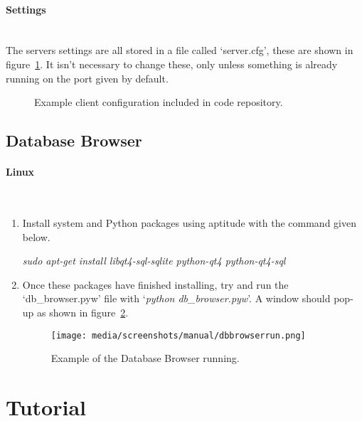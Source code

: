 \documentclass[12pt,a4paper]{report}
\begin{document}
        \paragraph{Settings}\mbox{}\\
        The servers settings are all stored in a file called `server.cfg', these are shown in figure~\ref{lst:servercfg}. It isn't
        necessary to change these, only unless something is already running on the port given by default.

        \begin{figure}[H]
            \centering
            \caption{Example client configuration included in code repository.}
            \label{lst:servercfg}
                
        \end{figure}

    \subsection{Database Browser}
        \paragraph{Linux}\mbox{}\\
        \begin{enumerate}
            \item Install system and Python packages using aptitude with the command given below.

            \textit{sudo apt-get install libqt4-sql-sqlite python-qt4 python-qt4-sql}

            \item Once these packages have finished installing, try and run the `db\_browser.pyw' file with `\textit{python db\_browser.pyw}'.
            A window should pop-up as shown in figure~\ref{fig:dbbrowserrun}.

            \begin{figure}[H]
                \centering
                \caption{Example of the Database Browser running.}
                \label{fig:dbbrowserrun}
                    \texttt{[image: media/screenshots/manual/dbbrowserrun.png]}
            \end{figure}
        \end{enumerate}

\section{Tutorial}
\end{document}
